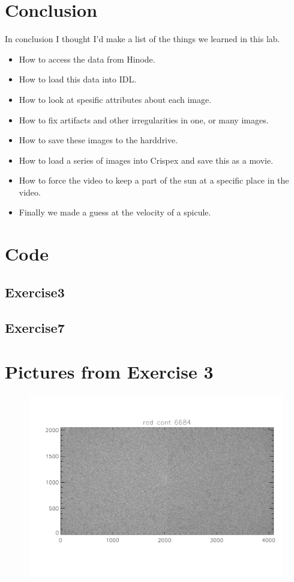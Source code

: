 \documentclass[a4paper,10pt]{report}
\begin{document}
\section{Conclusion}
In conclusion I thought I'd make a list of the things we learned in this lab.
\begin{itemize}
\item How to access the data from Hinode. 
\item How to load this data into IDL.
\item How to look at spesific attributes about each image.
\item How to fix artifacts and other irregularities in one, or many images.
\item How to save these images to the harddrive. 
\item How to load a series of images into Crispex and save this as a movie. 
\item How to force the video to keep a part of the sun at a specific place in the video.
\item Finally we made a guess at the velocity of a spicule.
\end{itemize}

\section{Code}
\subsection{Exercise3}

\newpage
\subsection{Exercise7}


\newpage
\section{Pictures from Exercise 3}
\begin{figure}[H]
\includegraphics[width=\linewidth]{file0.pdf}
\end{figure}
\end{document}
